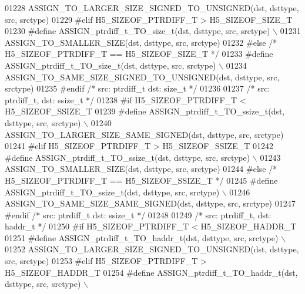 \begin{DoxyCode}
01228 \textcolor{preprocessor}{        ASSIGN\_TO\_LARGER\_SIZE\_SIGNED\_TO\_UNSIGNED(dst, dsttype, src, srctype)}
01229 \textcolor{preprocessor}{#elif H5\_SIZEOF\_PTRDIFF\_T > H5\_SIZEOF\_SIZE\_T}
01230 \textcolor{preprocessor}{    #define ASSIGN\_ptrdiff\_t\_TO\_size\_t(dst, dsttype, src, srctype) \(\backslash\)}
01231 \textcolor{preprocessor}{        ASSIGN\_TO\_SMALLER\_SIZE(dst, dsttype, src, srctype)}
01232 \textcolor{preprocessor}{#else }\textcolor{comment}{/* H5\_SIZEOF\_PTRDIFF\_T == H5\_SIZEOF\_SIZE\_T */}\textcolor{preprocessor}{}
01233 \textcolor{preprocessor}{    #define ASSIGN\_ptrdiff\_t\_TO\_size\_t(dst, dsttype, src, srctype) \(\backslash\)}
01234 \textcolor{preprocessor}{        ASSIGN\_TO\_SAME\_SIZE\_SIGNED\_TO\_UNSIGNED(dst, dsttype, src, srctype)}
01235 \textcolor{preprocessor}{#endif }\textcolor{comment}{/* src: ptrdiff\_t dst: size\_t */}\textcolor{preprocessor}{}
01236 
01237 \textcolor{comment}{/* src: ptrdiff\_t, dst: ssize\_t */}
01238 \textcolor{preprocessor}{#if H5\_SIZEOF\_PTRDIFF\_T < H5\_SIZEOF\_SSIZE\_T}
01239 \textcolor{preprocessor}{    #define ASSIGN\_ptrdiff\_t\_TO\_ssize\_t(dst, dsttype, src, srctype) \(\backslash\)}
01240 \textcolor{preprocessor}{        ASSIGN\_TO\_LARGER\_SIZE\_SAME\_SIGNED(dst, dsttype, src, srctype)}
01241 \textcolor{preprocessor}{#elif H5\_SIZEOF\_PTRDIFF\_T > H5\_SIZEOF\_SSIZE\_T}
01242 \textcolor{preprocessor}{    #define ASSIGN\_ptrdiff\_t\_TO\_ssize\_t(dst, dsttype, src, srctype) \(\backslash\)}
01243 \textcolor{preprocessor}{        ASSIGN\_TO\_SMALLER\_SIZE(dst, dsttype, src, srctype)}
01244 \textcolor{preprocessor}{#else }\textcolor{comment}{/* H5\_SIZEOF\_PTRDIFF\_T == H5\_SIZEOF\_SSIZE\_T */}\textcolor{preprocessor}{}
01245 \textcolor{preprocessor}{    #define ASSIGN\_ptrdiff\_t\_TO\_ssize\_t(dst, dsttype, src, srctype) \(\backslash\)}
01246 \textcolor{preprocessor}{        ASSIGN\_TO\_SAME\_SIZE\_SAME\_SIGNED(dst, dsttype, src, srctype)}
01247 \textcolor{preprocessor}{#endif }\textcolor{comment}{/* src: ptrdiff\_t dst: ssize\_t */}\textcolor{preprocessor}{}
01248 
01249 \textcolor{comment}{/* src: ptrdiff\_t, dst: haddr\_t */}
01250 \textcolor{preprocessor}{#if H5\_SIZEOF\_PTRDIFF\_T < H5\_SIZEOF\_HADDR\_T}
01251 \textcolor{preprocessor}{    #define ASSIGN\_ptrdiff\_t\_TO\_haddr\_t(dst, dsttype, src, srctype) \(\backslash\)}
01252 \textcolor{preprocessor}{        ASSIGN\_TO\_LARGER\_SIZE\_SIGNED\_TO\_UNSIGNED(dst, dsttype, src, srctype)}
01253 \textcolor{preprocessor}{#elif H5\_SIZEOF\_PTRDIFF\_T > H5\_SIZEOF\_HADDR\_T}
01254 \textcolor{preprocessor}{    #define ASSIGN\_ptrdiff\_t\_TO\_haddr\_t(dst, dsttype, src, srctype) \(\backslash\)}

\end{DoxyCode}
